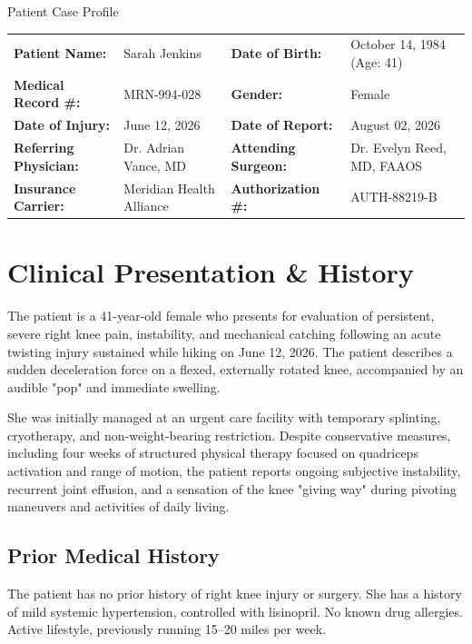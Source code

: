 \begin{patientcard}{Patient Case Profile}
\begin{tabularx}{\textwidth}{lXlX}
  \textbf{Patient Name:} & Sarah Jenkins & \textbf{Date of Birth:} & October 14, 1984 (Age: 41) \\
  \textbf{Medical Record \#:} & MRN-994-028 & \textbf{Gender:} & Female \\
  \textbf{Date of Injury:} & June 12, 2026 & \textbf{Date of Report:} & August 02, 2026 \\
  \textbf{Referring Physician:} & Dr. Adrian Vance, MD & \textbf{Attending Surgeon:} & Dr. Evelyn Reed, MD, FAAOS \\
  \textbf{Insurance Carrier:} & Meridian Health Alliance & \textbf{Authorization \#:} & AUTH-88219-B \\
\end{tabularx}
\end{patientcard}

\section{Clinical Presentation \& History}
\label{sec:presentation}

The patient is a 41-year-old female who presents for evaluation of persistent, severe right knee pain, instability, and mechanical catching following an acute twisting injury sustained while hiking on June 12, 2026. The patient describes a sudden deceleration force on a flexed, externally rotated knee, accompanied by an audible "pop" and immediate swelling.

She was initially managed at an urgent care facility with temporary splinting, cryotherapy, and non-weight-bearing restriction. Despite conservative measures, including four weeks of structured physical therapy focused on quadriceps activation and range of motion, the patient reports ongoing subjective instability, recurrent joint effusion, and a sensation of the knee "giving way" during pivoting maneuvers and activities of daily living.

\subsection{Prior Medical History}
The patient has no prior history of right knee injury or surgery. She has a history of mild systemic hypertension, controlled with lisinopril. No known drug allergies. Active lifestyle, previously running 15--20 miles per week.

